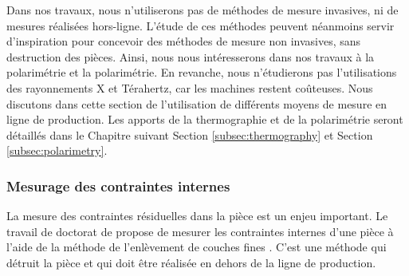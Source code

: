 Dans nos travaux, nous n'utiliserons pas de méthodes de mesure invasives, ni de mesures réalisées hors-ligne.
L'étude de ces méthodes peuvent néanmoins servir d'inspiration pour concevoir des méthodes de mesure non invasives, sans destruction des pièces.
Ainsi, nous nous intéresserons dans nos travaux à la polarimétrie et la polarimétrie.
En revanche, nous n'étudierons pas l'utilisations des rayonnements X et Térahertz, car les machines restent coûteuses.
Nous discutons dans cette section de l'utilisation de différents moyens de mesure en ligne de production.
Les apports de la thermographie et de la polarimétrie seront détaillés dans le Chapitre suivant Section \ref{subsec:thermography} et Section \ref{subsec:polarimetry}.

\subsubsection{Mesurage des contraintes internes}
La mesure des contraintes résiduelles dans la pièce est un enjeu important.
Le travail de doctorat de \citeauthor{giroud_mesure_2001} propose de mesurer les contraintes internes d'une pièce à l'aide de la méthode de l'enlèvement de couches fines \cite{giroud_mesure_2001}.
C'est une méthode qui détruit la pièce et qui doit être réalisée en dehors de la ligne de production.

